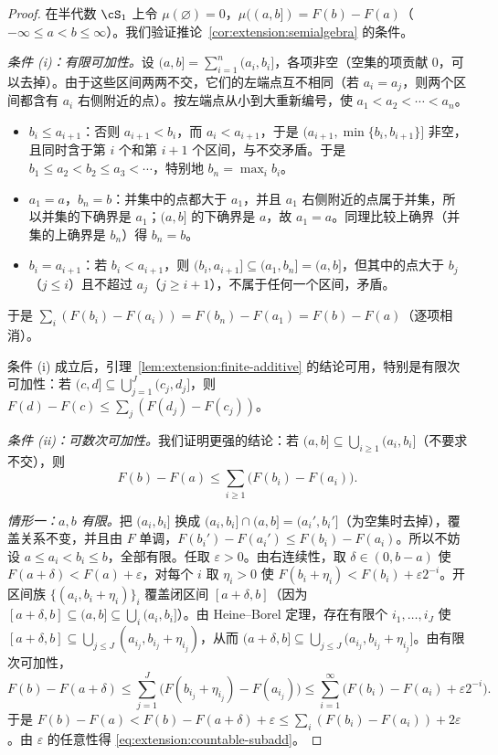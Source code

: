 \begin{proof}
在半代数 $\cS_1$ 上令 $\mu(\varnothing)=0$，$\mu((a,b])=F(b)-F(a)$（$-\infty\leqslant a<b\leqslant\infty$）。我们验证推论~\ref{cor:extension:semialgebra} 的条件。

\emph{条件 (i)：有限可加性。}设 $(a,b]=\sum_{i=1}^n(a_i,b_i]$，各项非空（空集的项贡献 $0$，可以去掉）。由于这些区间两两不交，它们的左端点互不相同（若 $a_i=a_j$，则两个区间都含有 $a_i$ 右侧附近的点）。按左端点从小到大重新编号，使 $a_1<a_2<\cdots<a_n$。
\begin{itemize}
\item $b_i\leqslant a_{i+1}$：否则 $a_{i+1}<b_i$，而 $a_i<a_{i+1}$，于是 $(a_{i+1},\min\{b_i,b_{i+1}\}]$ 非空，且同时含于第 $i$ 个和第 $i+1$ 个区间，与不交矛盾。于是 $b_1\leqslant a_2<b_2\leqslant a_3<\cdots$，特别地 $b_n=\max_ib_i$。
\item $a_1=a$，$b_n=b$：并集中的点都大于 $a_1$，并且 $a_1$ 右侧附近的点属于并集，所以并集的下确界是 $a_1$；$(a,b]$ 的下确界是 $a$，故 $a_1=a$。同理比较上确界（并集的上确界是 $b_n$）得 $b_n=b$。
\item $b_i=a_{i+1}$：若 $b_i<a_{i+1}$，则 $(b_i,a_{i+1}]\subseteq(a_1,b_n]=(a,b]$，但其中的点大于 $b_j$（$j\leqslant i$）且不超过 $a_j$（$j\geqslant i+1$），不属于任何一个区间，矛盾。
\end{itemize}
于是 $\sum_i(F(b_i)-F(a_i))=F(b_n)-F(a_1)=F(b)-F(a)$（逐项相消）。

条件 (i) 成立后，引理~\ref{lem:extension:finite-additive} 的结论可用，特别是有限次可加性：若 $(c,d]\subseteq\bigcup_{j=1}^J(c_j,d_j]$，则 $F(d)-F(c)\leqslant\sum_j(F(d_j)-F(c_j))$。

\emph{条件 (ii)：可数次可加性。}我们证明更强的结论：若 $(a,b]\subseteq\bigcup_{i\geqslant1}(a_i,b_i]$（不要求不交），则
\begin{equation}\label{eq:extension:countable-subadd}
F(b)-F(a)\leqslant\sum_{i\geqslant1}\bigl(F(b_i)-F(a_i)\bigr).
\end{equation}

\emph{情形一：$a,b$ 有限。}把 $(a_i,b_i]$ 换成 $(a_i,b_i]\cap(a,b]=(a_i',b_i']$（为空集时去掉），覆盖关系不变，并且由 $F$ 单调，$F(b_i')-F(a_i')\leqslant F(b_i)-F(a_i)$。所以不妨设 $a\leqslant a_i<b_i\leqslant b$，全部有限。任取 $\varepsilon>0$。由右连续性，取 $\delta\in(0,b-a)$ 使 $F(a+\delta)<F(a)+\varepsilon$，对每个 $i$ 取 $\eta_i>0$ 使 $F(b_i+\eta_i)<F(b_i)+\varepsilon2^{-i}$。开区间族 $\{(a_i,b_i+\eta_i)\}_i$ 覆盖闭区间 $[a+\delta,b]$（因为 $[a+\delta,b]\subseteq(a,b]\subseteq\bigcup_i(a_i,b_i]$）。由 Heine--Borel 定理，存在有限个 $i_1,\dots,i_J$ 使 $[a+\delta,b]\subseteq\bigcup_{j\leqslant J}(a_{i_j},b_{i_j}+\eta_{i_j})$，从而 $(a+\delta,b]\subseteq\bigcup_{j\leqslant J}(a_{i_j},b_{i_j}+\eta_{i_j}]$。由有限次可加性，
\[
F(b)-F(a+\delta)\leqslant\sum_{j=1}^J\bigl(F(b_{i_j}+\eta_{i_j})-F(a_{i_j})\bigr)\leqslant\sum_{i=1}^\infty\bigl(F(b_i)-F(a_i)+\varepsilon2^{-i}\bigr).
\]
于是 $F(b)-F(a)<F(b)-F(a+\delta)+\varepsilon\leqslant\sum_i(F(b_i)-F(a_i))+2\varepsilon$。由 $\varepsilon$ 的任意性得 \eqref{eq:extension:countable-subadd}。


\end{proof}
